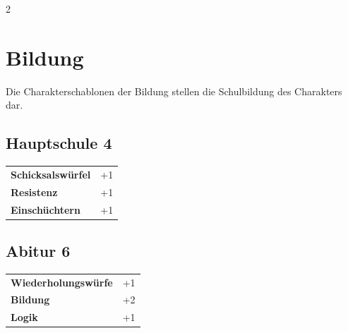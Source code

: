 \begin{multicols}{2}
\begin{tcolorbox}

\end{tcolorbox}

\section{Bildung}

Die Charakterschablonen der Bildung stellen die Schulbildung des Charakters dar.

\begin{tcolorbox}
    \subsection*{Hauptschule \hfill \small{4 }}
    \tcblower




\begin{tabular}{@{}ll@{}}
    \textbf{Schicksalswürfel} & +1\\
    \textbf{Resistenz} & +1\\
    \textbf{Einschüchtern} & +1\\
\end{tabular}


\end{tcolorbox}

\begin{tcolorbox}
    \subsection*{Abitur \hfill \small{6 }}
    \tcblower




\begin{tabular}{@{}ll@{}}
    \textbf{Wiederholungswürfe} & +1\\
    \textbf{Bildung} & +2\\
    \textbf{Logik} & +1\\
\end{tabular}


\end{tcolorbox}
\end{multicols}
